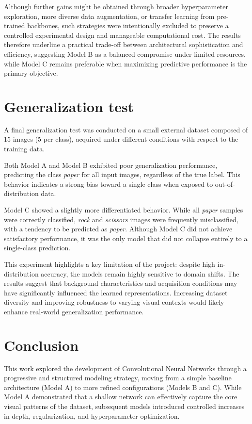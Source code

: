 \documentclass[11pt,a4paper]{article}
\begin{document}
Although further gains might be obtained through broader hyperparameter exploration, more diverse data augmentation, or transfer learning from pre-trained backbones, such strategies were intentionally excluded to preserve a controlled experimental design and manageable computational cost. The results therefore underline a practical trade-off between architectural sophistication and efficiency, suggesting Model B as a balanced compromise under limited resources, while Model C remains preferable when maximizing predictive performance is the primary objective.

\section{ Generalization test}

A final generalization test was conducted on a small external dataset composed of 15 images (5 per class), acquired under different conditions with respect to the training data.

Both Model A and Model B exhibited poor generalization performance, predicting the class \textit{paper} for all input images, regardless of the true label. This behavior indicates a strong bias toward a single class when exposed to out-of-distribution data.

Model C showed a slightly more differentiated behavior. While all \textit{paper} samples were correctly classified, \textit{rock} and \textit{scissors} images were frequently misclassified, with a tendency to be predicted as \textit{paper}. Although Model C did not achieve satisfactory performance, it was the only model that did not collapse entirely to a single-class prediction.

This experiment highlights a key limitation of the project: despite high in-distribution accuracy, the models remain highly sensitive to domain shifts. The results suggest that background characteristics and acquisition conditions may have significantly influenced the learned representations. Increasing dataset diversity and improving robustness to varying visual contexts would likely enhance real-world generalization performance.

\section{Conclusion}

This work explored the development of Convolutional Neural Networks through a progressive and structured modeling strategy, moving from a simple baseline architecture (Model A) to more refined configurations (Models B and C). While Model A demonstrated that a shallow network can effectively capture the core visual patterns of the dataset, subsequent models introduced controlled increases in depth, regularization, and hyperparameter optimization.
\end{document}
